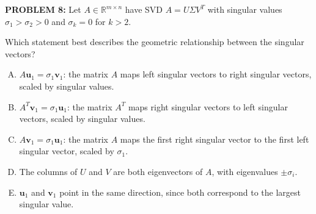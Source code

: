 \documentclass[12pt]{amsart}
\begin{document}
{{\bf PROBLEM 8:}
% 
Let $A \in \mathbb{R}^{m \times n}$ have SVD $A = U\Sigma V^T$ with singular values $\sigma_1 > \sigma_2 > 0$ and $\sigma_k = 0$ for $k > 2$.

Which statement best describes the geometric relationship between the singular vectors?

\begin{enumerate}[(A)]
\item $A\mathbf{u}_1 = \sigma_1 \mathbf{v}_1$: the matrix $A$ maps left singular vectors to right singular vectors, scaled by singular values.
\item $A^T\mathbf{v}_1 = \sigma_1 \mathbf{u}_1$: the matrix $A^T$ maps right singular vectors to left singular vectors, scaled by singular values.
\item $A\mathbf{v}_1 = \sigma_1 \mathbf{u}_1$: the matrix $A$ maps the first right singular vector to the first left singular vector, scaled by $\sigma_1$.
\item The columns of $U$ and $V$ are both eigenvectors of $A$, with eigenvalues $\pm\sigma_i$.
\item $\mathbf{u}_1$ and $\mathbf{v}_1$ point in the same direction, since both correspond to the largest singular value.
\end{enumerate}

%
%

}
\end{document}
